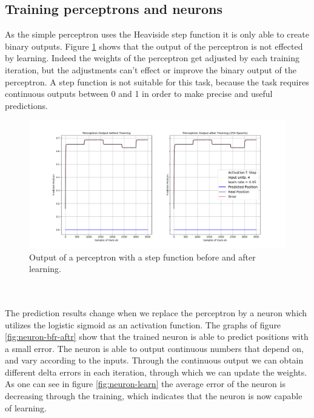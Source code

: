\documentclass[12pt, a4paper]{article}
\newcounter{task}
\begin{document}
\subsection*{Training perceptrons and neurons}

As the simple perceptron uses the Heaviside step function it is only able to create binary outputs. Figure \ref{fig:perceptron-bfr-aftr} shows that the output of the perceptron is not effected by learning. Indeed the weights of the perceptron get adjusted by each training iteration, but the adjustments can't effect or improve the binary output of the perceptron. A step function is not suitable for this task, because the task requires continuous outputs between 0 and 1 in order to make precise and useful predictions.
\begin{figure}[htbp]
	\begin{center}
		\includegraphics[width=16cm]{my_images/acw_p1/task2_perceptron_bfr_aftr.png}
	\end{center}
	\caption{Output of a perceptron with a step function before and after learning.}
	\label{fig:perceptron-bfr-aftr}
\end{figure}\\\\
The prediction results change when we replace the perceptron by a neuron which utilizes the logistic sigmoid as an activation function. The graphs of figure \ref{fig:neuron-bfr-aftr} show that the trained neuron is able to predict positions with a small error. The neuron is able to output continuous numbers that depend on, and vary according to the inputs. Through the continuous output we can obtain different delta errors in each iteration, through which we can update the weights. As one can see in figure \ref*{fig:neuron-learn} the average error of the neuron is decreasing through the training, which indicates that the neuron is now capable of learning.
\end{document}
